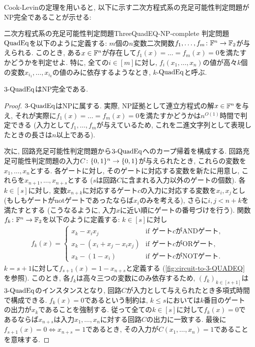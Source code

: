 Cook-Levinの定理を用いると, 以下に示す二次方程式系の充足可能性判定問題がNP完全であることが示せる:
\begin{theorem}{二次方程式系の充足可能性判定問題}{ThreeQuadEQ-NP-complete}
  判定問題$\text{QuadEq}$を以下のように定義する:
  $m$個の$n$変数二次関数$f_1,\dots,f_m\colon \mathbb{F}^n\to\mathbb{F}_2$が与えられる.
  このとき, ある$x\in\mathbb{F}^n$が存在して$f_1(x)=\dots=f_m(x)=0$を満たすかどうかを判定せよ.
  特に, 全ての$i\in[m]$に対し, $f_i(x_1,\dots,x_n)$の値が高々$k$個の変数$x_{i_1},\dots,x_{i_k}$の値のみに依存するようなとき, $k$-$\text{QuadEq}$と呼ぶ.
  
  $\text{3-QuadEq}$はNP完全である.
\end{theorem}
\begin{proof}
  $\text{3-QuadEq}$はNPに属する.
  実際, NP証拠として連立方程式の解$x\in\mathbb{F}^n$を与え, それが実際に$f_1(x)=\dots=f_m(x)=0$を満たすかどうかは$n^{O(1)}$時間で判定できる (入力として$f_1,\dots,f_m$が与えているため, これを二進文字列として表現したときの長さは$n$以上である).

  次に, 回路充足可能性判定問題から$\text{3-QuadEq}$へのカープ帰着を構成する.
  回路充足可能性判定問題の入力$C\colon\{0,1\}^n\to\{0,1\}$が与えられたとき, これらの変数を$x_1,\dots,x_n$とする.
  各ゲートに対し, そのゲートに対応する変数を新たに用意し, これらを$x_{n+1},\dots,x_{n+s}$とする ($s$は回路$C$に含まれる入力以外のゲートの個数).
  各$k\in[s]$に対し, 変数$x_{n+k}$に対応するゲート$c$の入力に対応する変数を$x_i,x_j$とし (もしもゲートがnotゲートであったならば$x_i$のみを考える), さらに$i,j < n+k$を満たすとする (こうなるように, 入力$x$に近い順にゲートの番号づけを行う).
  関数$f_k\colon \mathbb{F}^n\to\mathbb{F}_2$を以下のように定義する: $k\in[s]$に対し
  \begin{align*}
    f_k(x) = \begin{cases}
      x_k - x_i x_j & \text{if ゲート$c$がANDゲート}, \\
      x_k - (x_i + x_j - x_i x_j) & \text{if ゲート$c$がORゲート}, \\
      x_k - (1-x_i) & \text{if ゲート$c$がNOTゲート}.
    \end{cases}
  \end{align*}
  $k=s+1$に対して$f_{s+1}(x) = 1 - x_{n+s}$と定義する (\cref{fig:circuit-to-3-QUADEQ}を参照).
  このとき, 各$f_k$は高々三つの変数にのみ依存するため,
  $(f_k)_{k\in[s+1]}$は$\text{3-QuadEq}$のインスタンスとなり, 回路$C$が入力として与えられたとき多項式時間で構成できる.
  $f_k(x)=0$であるという制約は, $k\le s$においては$k$番目のゲートの出力が$x_k$であることを強制する.
  従って全ての$k\in[s]$に対して$f_k(x)=0$であるならば$x_{n+s}$は入力$x_1,\dots,x_n$に対する回路$C$の出力に一致する.
  最後に$f_{s+1}(x)=0\iff x_{n+s}=1$であるとき, その入力が$C(x_1,\dots,x_n)=1$であることを意味する.


\end{proof}
